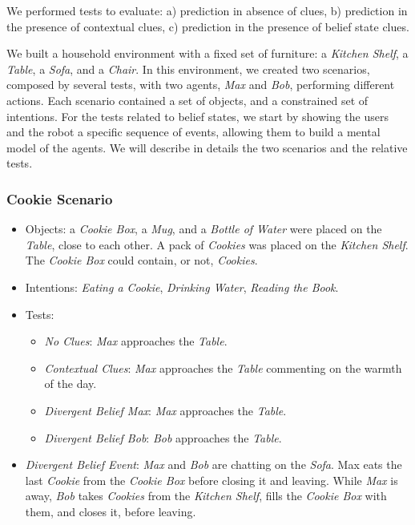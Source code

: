 We performed tests to evaluate: a) prediction in absence of clues, b) prediction in the presence of contextual clues, c) prediction in the presence of belief state clues.

We built a household environment with a fixed set of furniture: a \textit{Kitchen Shelf}, a \textit{Table}, a \textit{Sofa}, and a \textit{Chair}. In this environment, we created two scenarios, composed by several tests, with two agents, \textit{Max} and \textit{Bob}, performing different actions. Each scenario contained a set of objects, and a constrained set of intentions. For the tests related to belief states, we start by showing the users and the robot a specific sequence of events, allowing them to build a mental model of the agents. We will describe in details the two scenarios and the relative tests.

\subsubsection{Cookie Scenario}
\begin{itemize}
\item Objects: a \textit{Cookie Box}, a \textit{Mug}, and a \textit{Bottle of Water} were placed on the \textit{Table}, close to each other. A pack of \textit{Cookies} was placed on the \textit{Kitchen Shelf}. The \textit{Cookie Box} could contain, or not, \textit{Cookies}.
\item Intentions: \textit{Eating a Cookie}, \textit{Drinking Water}, \textit{Reading the Book}.
\item Tests:
\begin{itemize}
	\item \textit{No Clues}: \textit{Max} approaches the \textit{Table}.
    \item \textit{Contextual Clues}: \textit{Max} approaches the \textit{Table} commenting on the warmth of the day.
	\item \textit{Divergent Belief Max}: \textit{Max} approaches the \textit{Table}.
	\item \textit{Divergent Belief Bob}: \textit{Bob} approaches the \textit{Table}.
\end{itemize}
\item  \textit{Divergent Belief Event}:  \textit{Max} and \textit{Bob} are chatting on the \textit{Sofa}. Max eats the last \textit{Cookie} from the \textit{Cookie Box} before closing it and leaving. While \textit{Max} is away, \textit{Bob} takes \textit{Cookies} from the \textit{Kitchen Shelf}, fills the \textit{Cookie Box} with them, and closes it, before leaving.
\end{itemize}

